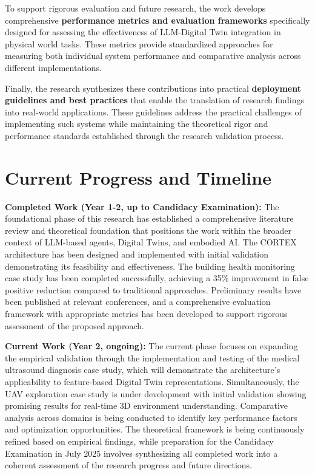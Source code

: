 To support rigorous evaluation and future research, the work develops comprehensive \textbf{performance metrics and evaluation frameworks} specifically designed for assessing the effectiveness of LLM-Digital Twin integration in physical world tasks. These metrics provide standardized approaches for measuring both individual system performance and comparative analysis across different implementations.

Finally, the research synthesizes these contributions into practical \textbf{deployment guidelines and best practices} that enable the translation of research findings into real-world applications. These guidelines address the practical challenges of implementing such systems while maintaining the theoretical rigor and performance standards established through the research validation process.

\section{Current Progress and Timeline}

\textbf{Completed Work (Year 1-2, up to Candidacy Examination):} The foundational phase of this research has established a comprehensive literature review and theoretical foundation that positions the work within the broader context of LLM-based agents, Digital Twins, and embodied AI. The CORTEX architecture has been designed and implemented with initial validation demonstrating its feasibility and effectiveness. The building health monitoring case study has been completed successfully, achieving a 35\% improvement in false positive reduction compared to traditional approaches. Preliminary results have been published at relevant conferences, and a comprehensive evaluation framework with appropriate metrics has been developed to support rigorous assessment of the proposed approach.

\textbf{Current Work (Year 2, ongoing):} The current phase focuses on expanding the empirical validation through the implementation and testing of the medical ultrasound diagnosis case study, which will demonstrate the architecture's applicability to feature-based Digital Twin representations. Simultaneously, the UAV exploration case study is under development with initial validation showing promising results for real-time 3D environment understanding. Comparative analysis across domains is being conducted to identify key performance factors and optimization opportunities. The theoretical framework is being continuously refined based on empirical findings, while preparation for the Candidacy Examination in July 2025 involves synthesizing all completed work into a coherent assessment of the research progress and future directions.

